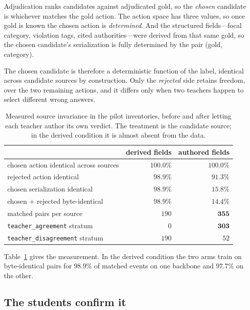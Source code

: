 \documentclass[10pt]{article}
\begin{document}
Adjudication ranks candidates against adjudicated gold, so the \emph{chosen} candidate
is whichever matches the gold action. The action space has three values, so once gold
is known the chosen action is \emph{determined}. And the structured fields---focal
category, violation tags, cited authorities---were derived from that same gold, so the
chosen candidate's serialization is fully determined by the pair (gold, category).

The chosen candidate is therefore a deterministic function of the label, identical
across candidate sources by construction. Only the \emph{rejected} side retains
freedom, over the two remaining actions, and it differs only when two teachers happen
to select different wrong answers.

\begin{table}[t]
\centering
\caption{Measured source invariance in the pilot inventories, before and after
letting each teacher author its own verdict. The treatment is the candidate source;
in the derived condition it is almost absent from the data.}
\label{tab:invariance}
\begin{tabular}{lrr}
\toprule
& derived fields & \textbf{authored fields} \\
\midrule
chosen action identical across sources     & $100.0\%$ & $100.0\%$ \\
rejected action identical                  & $98.9\%$  & $91.3\%$ \\
chosen serialization identical             & $98.9\%$  & $\mathbf{15.8\%}$ \\
chosen + rejected byte-identical           & $98.9\%$  & $\mathbf{14.4\%}$ \\
\midrule
matched pairs per source                   & $190$     & $\mathbf{355}$ \\
\texttt{teacher\_agreement} stratum        & $0$       & $\mathbf{303}$ \\
\texttt{teacher\_disagreement} stratum     & $190$     & $52$ \\
\bottomrule
\end{tabular}
\end{table}

Table~\ref{tab:invariance} gives the measurement. In the derived condition the two arms
train on byte-identical pairs for $98.9\%$ of matched events on one backbone and
$97.7\%$ on the other.

\subsection{The students confirm it}
\end{document}
